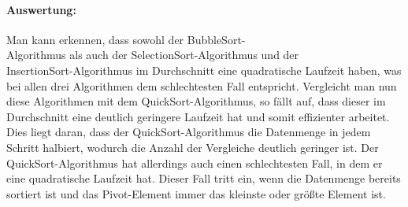 \documentclass[../entry.tex]{subfiles}
\begin{document}
    \paragraph{Auswertung:}
    Man kann erkennen, dass sowohl der BubbleSort-\\
    Algorithmus als auch der SelectionSort-Algorithmus
    und der \\
    InsertionSort-Algorithmus im Durchschnitt eine quadratische Laufzeit haben, was bei allen
    drei Algorithmen dem schlechtesten Fall entspricht.
    Vergleicht man nun diese Algorithmen mit dem QuickSort-Algorithmus, so fällt auf, dass dieser
    im Durchschnitt eine deutlich geringere Laufzeit hat und somit effizienter arbeitet.
    Dies liegt daran, dass der QuickSort-Algorithmus die Datenmenge in jedem Schritt halbiert,
    wodurch die Anzahl der Vergleiche deutlich geringer ist.
    Der QuickSort-Algorithmus hat allerdings auch einen schlechtesten Fall, in dem er eine quadratische Laufzeit hat.
    Dieser Fall tritt ein, wenn die Datenmenge bereits sortiert ist und das Pivot-Element immer das kleinste oder größte Element ist.
\end{document}
